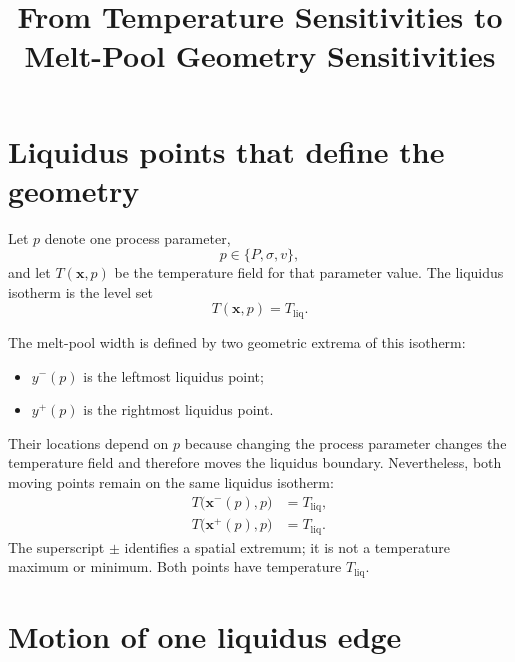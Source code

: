 \documentclass[11pt]{article}
\title{From Temperature Sensitivities to Melt-Pool Geometry Sensitivities}
\author{}
\date{}
\newcommand{\Tliq}{T_{\mathrm{liq}}}
\begin{document}
\maketitle

\section{Liquidus points that define the geometry}

Let $p$ denote one process parameter,
\begin{equation}
  p\in\{P,\sigma,v\},
\end{equation}
and let $T(\bm{x},p)$ be the temperature field for that parameter value.  The
liquidus isotherm is the level set
\begin{equation}
  T(\bm{x},p)=\Tliq.
\end{equation}

The melt-pool width is defined by two geometric extrema of this isotherm:
\begin{itemize}
  \item $y^-(p)$ is the leftmost liquidus point;
  \item $y^+(p)$ is the rightmost liquidus point.
\end{itemize}
Their locations depend on $p$ because changing the process parameter changes
the temperature field and therefore moves the liquidus boundary.  Nevertheless,
both moving points remain on the same liquidus isotherm:
\begin{align}
  T\bigl(\bm{x}^-(p),p\bigr) &= \Tliq, \\
  T\bigl(\bm{x}^+(p),p\bigr) &= \Tliq.
\end{align}
The superscript $\pm$ identifies a spatial extremum; it is not a temperature
maximum or minimum.  Both points have temperature $\Tliq$.

\section{Motion of one liquidus edge}
\end{document}
